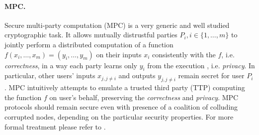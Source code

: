 \documentclass[
  digital, %
  twoside, %
  table,   %
  lof,     %
  lot,     %
]{fithesis3}
\newcounter{ph4_show_guides}
\theoremstyle{definition}
\theoremstyle{remark}
\begin{document}
\paragraph{MPC.}%
Secure multi-party computation (MPC) is a very generic and well studied cryptographic task.
It allows mutually distrustful parties $P_i, i \in \{1,\dots,m\}$ to jointly perform a distributed computation of a function $f(x_i,\dots,x_m) = (y_i,\dots,y_m)$ on their inputs $x_i$ consistently with the $f$, i.e. \emph{correctness}, in a way each party learns only $y_i$ from the execution , i.e. \emph{privacy}. In particular, other users' inputs $x_{j, j \neq i}$ and outputs $y_{j, j \neq i}$ remain secret for user $P_i$.
MPC intuitively attempts to emulate a trusted third party (TTP) computing the function $f$ on user's behalf, preserving the \emph{correctness} and \emph{privacy}.
MPC protocols should remain secure even with presence of a coalition of colluding corrupted nodes, depending on the particular security properties.
For more formal treatment please refer to \cite{G09}.
\end{document}
